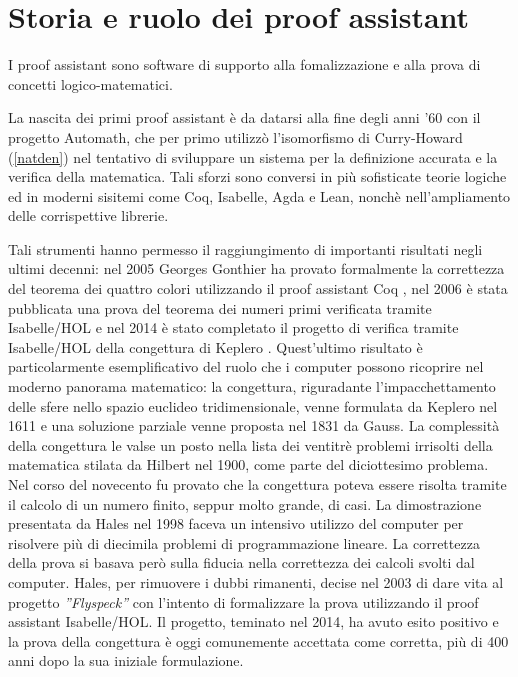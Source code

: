 \section{Storia e ruolo dei proof assistant}
I proof assistant sono software di supporto alla fomalizzazione e alla prova di concetti logico-matematici. 

La nascita dei primi proof assistant è da datarsi alla fine degli anni '60 con il progetto Automath, che per primo utilizzò l'isomorfismo di Curry-Howard (\ref{natden}) nel tentativo di sviluppare un sistema per la definizione accurata e la verifica della matematica. Tali sforzi sono conversi in più sofisticate teorie logiche ed in moderni sisitemi come Coq, Isabelle, Agda e Lean, nonchè nell'ampliamento delle corrispettive librerie.

Tali strumenti hanno permesso il raggiungimento di importanti risultati negli ultimi decenni: nel 2005 Georges Gonthier ha provato formalmente la correttezza del teorema dei quattro colori utilizzando il proof assistant Coq \cite{Gonthier2005ACP}, nel 2006 è stata pubblicata una prova del teorema dei numeri primi verificata tramite Isabelle/HOL \cite{Avigad2007} e nel 2014 è stato completato il progetto di verifica tramite Isabelle/HOL della congettura di Keplero \cite{hales2017}. Quest'ultimo risultato è particolarmente esemplificativo del ruolo che i computer possono ricoprire nel moderno panorama matematico: la congettura, riguradante l'impacchettamento delle sfere nello spazio euclideo tridimensionale, venne formulata da Keplero nel 1611 e una soluzione parziale venne proposta nel 1831 da Gauss. La complessità della congettura le valse un posto nella lista dei ventitrè problemi irrisolti della matematica stilata da Hilbert nel 1900, come parte del diciottesimo problema. Nel corso del novecento fu provato che la congettura poteva essere risolta tramite il calcolo di un numero finito, seppur molto grande, di casi. La dimostrazione presentata da Hales nel 1998 faceva un intensivo utilizzo del computer per risolvere più di diecimila problemi di programmazione lineare. La correttezza della prova si basava però sulla fiducia nella correttezza dei calcoli svolti dal computer. Hales, per rimuovere i dubbi rimanenti, decise nel 2003 di dare vita al progetto \emph{”Flyspeck”} con l'intento di formalizzare la prova utilizzando il proof assistant Isabelle/HOL. Il progetto, teminato nel 2014, ha avuto esito positivo e la prova della congettura è oggi comunemente accettata come corretta, più di 400 anni dopo la sua iniziale formulazione. 


